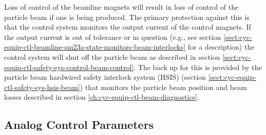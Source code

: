 \documentclass[11pt]{book}		%
\begin{document}
Loss of control of the beamline magnets will result in loss of control of the particle beam if one is being produced.  The primary protection against this is that the control system monitors the output current of the control magnets.  If the output current is out of tolerance or in question (e.g., see section \ref{sect:cyc-equip-ctl-beamline-sm23a-state-monitors-beam-interlocks} for a description) the control system will shut off the particle beam as described in section \ref{sect:cyc-equip-ctl-safety-sys-control-beam-control}.  The back up for this is provided by the particle beam hardwired safety interlock system (HSIS) (section \ref{sect:cyc-equip-ctl-safety-sys-hsis-beam}) that monitors the particle beam position and beam losses described in section \ref{ch:cyc-equip-ctl-beam-diagnostics}.


\subsection{Analog Control Parameters}
\end{document}
